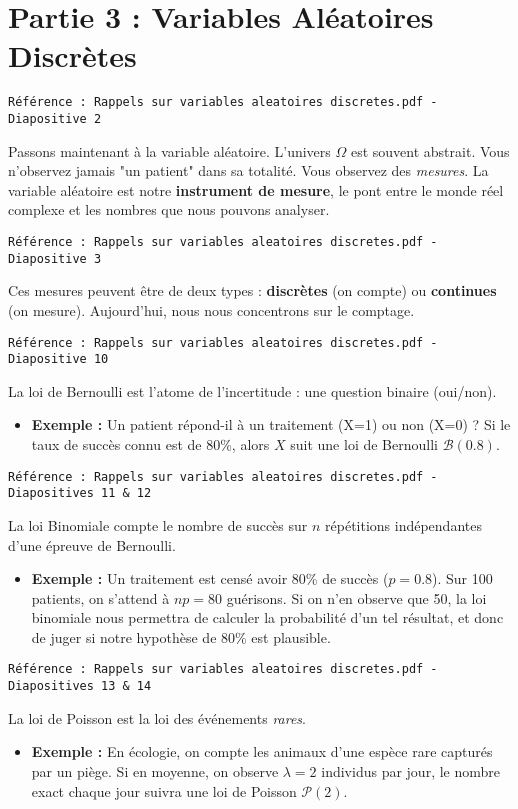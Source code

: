 \documentclass[12pt, a4paper]{article}
\newcommand{\slidenote}[1]{%
    \par\vspace{1.5ex}%
    \noindent\texttt{\small\color{gray}#1}\par\nopagebreak\vspace{1.5ex}%
}
\begin{document}
\section*{Partie 3 : Variables Aléatoires Discrètes}

\slidenote{Référence : Rappels sur variables aleatoires discretes.pdf - Diapositive 2}
Passons maintenant à la variable aléatoire. L'univers $\Omega$ est souvent abstrait. Vous n'observez jamais "un patient" dans sa totalité. Vous observez des \textit{mesures}.
La variable aléatoire est notre \textbf{instrument de mesure}, le pont entre le monde réel complexe et les nombres que nous pouvons analyser.

\slidenote{Référence : Rappels sur variables aleatoires discretes.pdf - Diapositive 3}
Ces mesures peuvent être de deux types : \textbf{discrètes} (on compte) ou \textbf{continues} (on mesure). Aujourd'hui, nous nous concentrons sur le comptage.

\slidenote{Référence : Rappels sur variables aleatoires discretes.pdf - Diapositive 10}
La loi de Bernoulli est l'atome de l'incertitude : une question binaire (oui/non).
\begin{itemize}
    \item \textbf{Exemple :} Un patient répond-il à un traitement (X=1) ou non (X=0) ? Si le taux de succès connu est de 80\%, alors $X$ suit une loi de Bernoulli $\mathcal{B}(0.8)$.
\end{itemize}

\slidenote{Référence : Rappels sur variables aleatoires discretes.pdf - Diapositives 11 \& 12}
La loi Binomiale compte le nombre de succès sur $n$ répétitions indépendantes d'une épreuve de Bernoulli.
\begin{itemize}
    \item \textbf{Exemple :} Un traitement est censé avoir 80\% de succès ($p=0.8$). Sur 100 patients, on s'attend à $np=80$ guérisons. Si on n'en observe que 50, la loi binomiale nous permettra de calculer la probabilité d'un tel résultat, et donc de juger si notre hypothèse de 80\% est plausible.
\end{itemize}

\slidenote{Référence : Rappels sur variables aleatoires discretes.pdf - Diapositives 13 \& 14}
La loi de Poisson est la loi des événements \textit{rares}.
\begin{itemize}
    \item \textbf{Exemple :} En écologie, on compte les animaux d'une espèce rare capturés par un piège. Si en moyenne, on observe $\lambda=2$ individus par jour, le nombre exact chaque jour suivra une loi de Poisson $\mathcal{P}(2)$.
\end{itemize}
\end{document}
